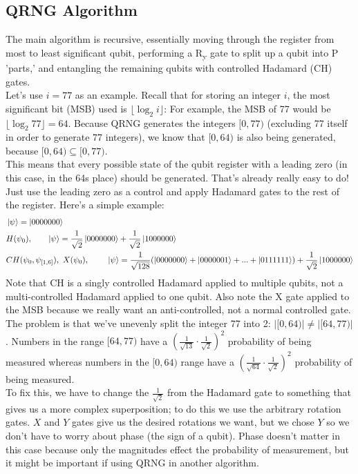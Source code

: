 \documentclass[12pt]{article}
\begin{document}
\subsection{QRNG Algorithm}
The main algorithm is recursive, essentially moving through the register from most to least significant qubit, performing a R\textsubscript{y} gate to split up a qubit into P 'parts,' and entangling the remaining qubits with controlled Hadamard (CH) gates. \\
Let's use $i = 77$ as an example. Recall that for storing an integer $i$, the most significant bit (MSB) used is $\lfloor \log_2 i \rfloor$: For example, the MSB of 77 would be $\lfloor \log_2 77 \rfloor = 64$. Because QRNG generates the integers $[0, 77)$ (excluding 77 itself in order to generate 77 integers), we know that $[0, 64)$ is also being generated, because $[0, 64) \subseteq [0, 77)$. \\
This means that every possible state of the qubit register with a leading zero (in this case, in the 64s place) should be generated. That's already really easy to do! Just use the leading zero as a control and apply Hadamard gates to the rest of the register. Here's a simple example:
\begin{align*}
& \ket{\psi} = \ket{0000000} \\
& H(\psi_0), \ \ \ \ \ \ \ket{\psi} = \frac{1}{\sqrt{2}} \ket{0000000} + \frac{1}{\sqrt{2}} \ket{1000000} \\
& CH(\psi_0, \psi_{[1, 6]}), \ X(\psi_0), \ \ \ \ \ \ \ \ket{\psi} = \frac{1}{\sqrt{128}}(\ket{0000000} + \ket{0000001} + ... + \ket{0111111}) + \frac{1}{\sqrt{2}} \ket{1000000}
\end{align*}
Note that CH is a singly controlled Hadamard applied to multiple qubits, not a multi-controlled Hadamard applied to one qubit. Also note the X gate applied to the MSB because we really want an anti-controlled, not a normal controlled gate. \\
The problem is that we've unevenly split the integer 77 into 2: $|[0, 64)| \neq |[64, 77)|$. Numbers in the range $[64, 77)$ have a $(\frac{1}{\sqrt{13}} \cdot \frac{1}{\sqrt{2}})^2$ probability of being measured whereas numbers in the $[0, 64)$ range have a $(\frac{1}{\sqrt{64}} \cdot \frac{1}{\sqrt{2}})^2$ probability of being measured. \\
To fix this, we have to change the $\frac{1}{\sqrt{2}}$ from the Hadamard gate to something that gives us a more complex superposition; to do this we use the arbitrary rotation gates. $X$ and $Y$ gates give us the desired rotations we want, but we chose $Y$ so we don't have to worry about phase (the sign of a qubit). Phase doesn't matter in this case because only the magnitudes effect the probability of measurement, but it might be important if using QRNG in another algorithm. \\
\end{document}
